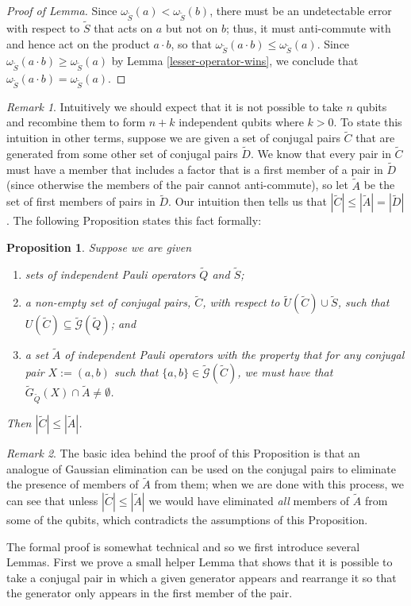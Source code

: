 \documentclass{amsbook}
\theoremstyle{plain}
\newtheorem{proposition}{Proposition}
\theoremstyle{definition}
\theoremstyle{remark}
\newtheorem{remark}{Remark}
\newcommand{\set}{\tilde}
\newcommand{\genfun}{\tilde{\mathcal{G}}}
\newcommand{\om}{\omega}
\begin{document}
\begin{proof}[Proof of Lemma]
Since $\om_{\set S}(a)<\om_{\set S}(b)$, there must be an undetectable error with respect to $\set S$ that acts on $a$ but not on $b$;  thus, it must anti-commute with and hence act on the product $a\cdot b$, so that $\om_{\set S}(a\cdot b)\le \om_{\set S}(a)$.  Since $\om_{\set S}(a\cdot b)\ge \om_{\set S}(a)$ by Lemma \ref{lesser-operator-wins}, we conclude that $\om_{\set S}(a\cdot b) = \om_{\set S}(a)$.
\end{proof}
\begin{remark}
Intuitively we should expect that it is not possible to take $n$ qubits and recombine them to form $n+k$ independent qubits where $k>0$.  To state this intuition in other terms, suppose we are given a set of conjugal pairs $\set C$ that are generated from some other set of conjugal pairs $\set D$.  We know that every pair in $\set C$ must have a member that includes a factor that is a first member of a pair in $\set D$ (since otherwise the members of the pair cannot anti-commute), so let $\set A$ be the set of first members of pairs in $\set D$.  Our intuition then tells us that $|\set C|\le |\set A|=|\set D|$.  The following Proposition states this fact formally:
\end{remark}
\begin{proposition}
\label{bound-on-recombinations}
Suppose we are given
\begin{enumerate}
\item sets of independent Pauli operators $\set Q$ and $\set S$;
\item a non-empty set of conjugal pairs, $\set C$, with respect to $\set U(\set C) \cup \set S$, such that $U(\set C)\subseteq \genfun(\set Q)$; and
\item a set $\set A$ of independent Pauli operators with the property that for any conjugal pair $X:=(a,b)$ such that $\{a,b\}\in\genfun(\set C)$, we must have that $\set G_{\set Q}(X) \cap \set A \ne \emptyset$.
\end{enumerate}
Then $|\set C|\le|\set A|$.
\end{proposition}
\begin{remark}
The basic idea behind the proof of this Proposition is that an analogue of Gaussian elimination can be used on the conjugal pairs to eliminate the presence of members of $\set A$ from them;  when we are done with this process, we can see that unless $|\set C|\le |\set A|$ we would have eliminated \emph{all} members of $\set A$ from some of the qubits, which contradicts the assumptions of this Proposition.

The formal proof is somewhat technical and so we first introduce several Lemmas.  First we prove a small helper Lemma that shows that it is possible to take a conjugal pair in which a given generator appears and rearrange it so that the generator only appears in the first member of the pair.
\end{remark}
\end{document}
